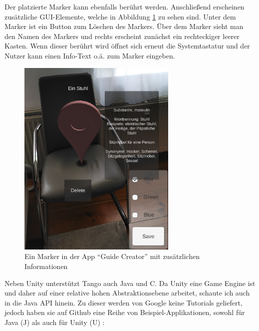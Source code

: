 Der platzierte Marker kann ebenfalls berührt werden. Anschließend erscheinen zusätzliche GUI-Elemente, welche in Abbildung \ref{example_app_tango_unity} zu sehen sind. Unter dem Marker ist ein Button zum Löschen des Markers. Über dem Marker sieht man den Namen des Markers und rechts erscheint zunächst ein rechteckiger leerer Kasten. Wenn dieser berührt wird öffnet sich erneut die Systemtastatur und der Nutzer kann einen Info-Text o.ä. zum Marker eingeben.

\begin{figure}[h]
	\centering
	\includegraphics[width=3in]{pictures/chair}
	\caption{Ein Marker in der App "`Guide Creator"' mit zusätzlichen Informationen}
	\label{example_app_tango_unity}
\end{figure}
Neben Unity unterstützt Tango auch Java und C. Da Unity eine Game Engine ist und daher auf einer relative hohen Abstraktionsebene arbeitet, schaute ich auch in die Java API hinein. Zu dieser werden von Google keine Tutorials geliefert, jedoch haben sie auf Github eine Reihe von Beispiel-Applikationen, sowohl für Java (J)  \cite{tango_java_github} als auch für Unity (U) \cite{tango_unity_github}:

